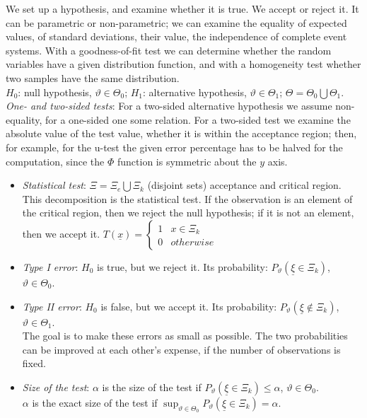 \documentclass[margin=0px]{article}
\begin{document}
We set up a hypothesis, and examine whether it is true. We accept or reject it. It can be parametric or non-parametric; we can examine the equality of expected values, of standard deviations, their value, the independence of complete event systems. With a goodness-of-fit test we can determine whether the random variables have a given distribution function, and with a homogeneity test whether two samples have the same distribution. \\
$H_0$: null hypothesis, $\vartheta \in \Theta_0$; $H_1$: alternative hypothesis, $\vartheta \in \Theta_1$; $\Theta = \Theta_0 \bigcup \Theta_1$. \\
\textit{One- and two-sided tests}: For a two-sided alternative hypothesis we assume non-equality, for a one-sided one some relation. For a two-sided test we examine the absolute value of the test value, whether it is within the acceptance region; then, for example, for the u-test the given error percentage has to be halved for the computation, since the $\Phi$ function is symmetric about the $y$ axis.
\begin{itemize}
    \item \textit{Statistical test}: $\Xi = \Xi_e \bigcup \Xi_k$ (disjoint sets) acceptance and critical region. This decomposition is the statistical test. If the observation is an element of the critical region, then we reject the null hypothesis; if it is not an element, then we accept it. $T(\underline{x}) = \left\{\begin{array} {lr} 1 & x \in \Xi_k \\ 0 & otherwise \end{array}\right.$
    \item \textit{Type I error}: $H_0$ is true, but we reject it. Its probability: $P_{\vartheta}(\underline{\xi} \in \Xi_k)$, $\vartheta \in \Theta_0$.
    \item \textit{Type II error}: $H_0$ is false, but we accept it. Its probability: $P_{\vartheta}(\underline{\xi} \notin \Xi_k)$, $\vartheta \in \Theta_1$. \\
          The goal is to make these errors as small as possible. The two probabilities can be improved at each other's expense, if the number of observations is fixed.
    \item \textit{Size of the test}: $\alpha$ is the size of the test if $P_{\vartheta}(\underline{\xi} \in \Xi_k) \leq \alpha$, $\vartheta \in \Theta_0$. \\
          $\alpha$ is the exact size of the test if $\sup_{\vartheta \in \Theta_0}{P_{\vartheta}(\underline{\xi} \in \Xi_k) = \alpha}$.
\end{itemize}
\end{document}
